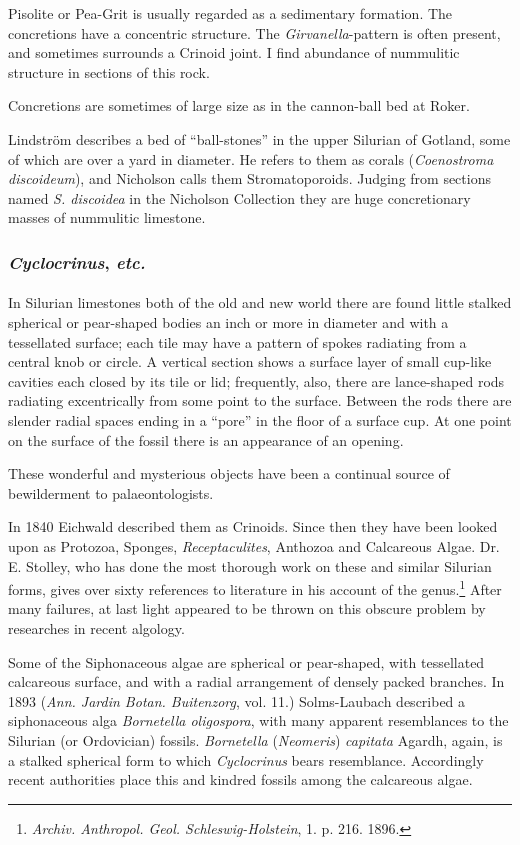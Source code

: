 \documentclass[a4paper, 12pt, oneside]{article}
\begin{document}
Pisolite or Pea-Grit is usually regarded as a sedimentary formation. The concretions have a concentric structure. The \emph{Girvanella}-pattern is often present, and sometimes surrounds a Crinoid joint. I find abundance of nummulitic structure in sections of this rock.

Concretions are sometimes of large size as in the cannon-ball bed at Roker.

Lindström describes a bed of ``ball-stones'' in the upper Silurian of Gotland, some of which are over a yard in diameter. He refers to them as corals (\emph{Coenostroma discoideum}), and Nicholson calls them Stromatoporoids. Judging from sections named \emph{S. discoidea} in the Nicholson Collection they are huge concretionary masses of nummulitic limestone.

\subsubsection{\emph{Cyclocrinus}, \emph{etc.}}
\paragraph{}
In Silurian limestones both of the old and new world there are found little stalked spherical or pear-shaped bodies an inch or more in diameter and with a tessellated surface; each tile may have a pattern of spokes radiating from a central knob or circle. A vertical section shows a surface layer of small cup-like cavities each closed by its tile or lid; frequently, also, there are lance-shaped rods radiating excentrically from some point to the surface. Between the rods there are slender radial spaces ending in a ``pore'' in the floor of a surface cup. At one point on the surface of the fossil there is an appearance of an opening.

These wonderful and mysterious objects have been a continual source of bewilderment to palaeontologists.

In 1840 Eichwald described them as Crinoids. Since then they have been looked upon as Protozoa, Sponges, \emph{Receptaculites}, Anthozoa and Calcareous Algae. Dr. E. Stolley, who has done the most thorough work on these and similar Silurian forms, gives over sixty references to literature in his account of the genus.\footnote{\emph{Archiv. Anthropol. Geol. Schleswig-Holstein}, 1. p. 216. 1896.} After many failures, at last light appeared to be thrown on this obscure problem by researches in recent algology.

Some of the Siphonaceous algae are spherical or pear-shaped, with tessellated calcareous surface, and with a radial arrangement of densely packed branches. In 1893 (\emph{Ann. Jardin Botan. Buitenzorg}, vol. 11.) Solms-Laubach described a siphonaceous alga \emph{Bornetella oligospora}, with many apparent resemblances to the Silurian (or Ordovician) fossils. \emph{Bornetella} (\emph{Neomeris}) \emph{capitata} Agardh, again, is a stalked spherical form to which \emph{Cyclocrinus} bears resemblance. Accordingly recent authorities place this and kindred fossils among the calcareous algae.
\end{document}
